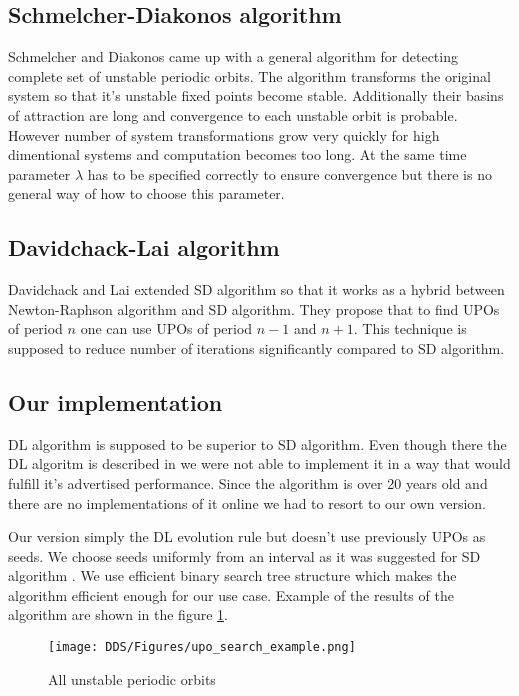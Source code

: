 \subsection{Schmelcher-Diakonos algorithm}
Schmelcher and Diakonos came up with a general algorithm for detecting complete set of unstable periodic orbits.
The algorithm transforms the original system so that it's unstable fixed points become stable.
Additionally their basins of attraction are long and convergence to each unstable orbit is probable.
However number of system transformations grow very quickly for high dimentional systems and computation becomes too long.
At the same time parameter $\lambda$ has to be specified correctly to ensure convergence but there is no general way of how to choose this parameter. \cite{Schmelcher1997}

\subsection{Davidchack-Lai algorithm}
Davidchack and Lai extended SD algorithm so that it works as a hybrid between Newton-Raphson algorithm and SD algorithm.
They propose that to find UPOs of period $n$ one can use UPOs of period $n-1$ and $n+1$.
This technique is supposed to reduce number of iterations significantly compared to SD algorithm. \cite{Davidchack1999}

\subsection{Our implementation}
DL algorithm is supposed to be superior to SD algorithm.
Even though there the DL algoritm is described in \cite{Davidchack1999,Davidchack2001,Klebanoff2001} we were not able to implement it in a way that would fulfill it's advertised performance.
Since the algorithm is over 20 years old and there are no implementations of it online we had to resort to our own version.
\par
Our version simply the DL evolution rule but doesn't use previously UPOs as seeds.
We choose seeds uniformly from an interval as it was suggested for SD algorithm \cite{Schmelcher1997}.
We use efficient binary search tree structure which makes the algorithm efficient enough for our use case.
Example of the results of the algorithm are shown in the figure \ref{fig:upo_search_example}.

\begin{figure}[!h]
    \centering
    \texttt{[image: DDS/Figures/upo\_search\_example.png]}
    \caption{All unstable periodic orbits}
    \label{fig:upo_search_example}
\end{figure}


